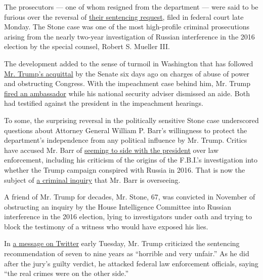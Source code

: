 The prosecutors --- one of whom resigned from the department --- were
said to be furious over the reversal of
\href{https://www.nytimes.com/2020/02/10/us/roger-stone-prison-sentence.html}{their
sentencing request}, filed in federal court late Monday. The Stone case
was one of the most high-profile criminal prosecutions arising from the
nearly two-year investigation of Russian interference in the 2016
election by the special counsel, Robert S. Mueller III.

The development added to the sense of turmoil in Washington that has
followed
\href{https://www.nytimes.com/2020/02/05/us/politics/trump-acquitted-impeachment.html}{Mr.
Trump's acquittal} by the Senate six days ago on charges of abuse of
power and obstructing Congress. With the impeachment case behind him,
Mr. Trump
\href{https://www.nytimes.com/2020/02/07/us/politics/alexander-vindman-gordon-sondland-fired.html}{fired
an ambassador} while his national security adviser dismissed an aide.
Both had testified against the president in the impeachment hearings.

To some, the surprising reversal in the politically sensitive Stone case
underscored questions about Attorney General William P. Barr's
willingness to protect the department's independence from any political
influence by Mr. Trump. Critics have accused Mr. Barr of
\href{https://www.nytimes.com/2019/04/18/us/politics/william-barr-robert-mueller-donald-trump.html}{seeming
to side with the president} over law enforcement, including his
criticism of the origins of the F.B.I.'s investigation into whether the
Trump campaign conspired with Russia in 2016. That is now the subject of
\href{https://www.nytimes.com/2019/10/24/us/politics/john-durham-criminal-investigation.html}{a
criminal inquiry} that Mr. Barr is overseeing.

A friend of Mr. Trump for decades, Mr. Stone, 67, was convicted in
November of obstructing an inquiry by the House Intelligence Committee
into Russian interference in the 2016 election, lying to investigators
under oath and trying to block the testimony of a witness who would have
exposed his lies.

In
\href{https://twitter.com/realDonaldTrump/status/1227122206783811585}{a
message on Twitter} early Tuesday, Mr. Trump criticized the sentencing
recommendation of seven to nine years as ``horrible and very unfair.''
As he did after the jury's guilty verdict, he attacked federal law
enforcement officials, saying ``the real crimes were on the other
side.''

